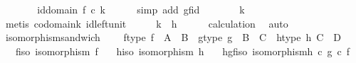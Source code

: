 \begin{isabellebody}
\ \ \isamarkupfalse%
\ \isamarkupfalse%
\ {\isachardoublequoteopen}{\isachardot}{\kern0pt}{\isachardot}{\kern0pt}{\isachardot}{\kern0pt}\ {\isacharequal}{\kern0pt}\ id{\isacharparenleft}{\kern0pt}domain\ f{\isacharparenright}{\kern0pt}\ {\isasymcirc}\isactrlsub c\ k{\isachardoublequoteclose}\isanewline
\ \ \ \ \isamarkupfalse%
\ {\isacharparenleft}{\kern0pt}simp\ add{\isacharcolon}{\kern0pt}\ gf{\isacharunderscore}{\kern0pt}id{\isacharparenright}{\kern0pt}\isanewline
\ \ \isamarkupfalse%
\ \isamarkupfalse%
\ {\isachardoublequoteopen}{\isachardot}{\kern0pt}{\isachardot}{\kern0pt}{\isachardot}{\kern0pt}\ {\isacharequal}{\kern0pt}\ k{\isachardoublequoteclose}\isanewline
\ \ \ \ \isamarkupfalse%
\ {\isacharparenleft}{\kern0pt}metis\ codomain{\isacharunderscore}{\kern0pt}k\ id{\isacharunderscore}{\kern0pt}left{\isacharunderscore}{\kern0pt}unit{\isacharparenright}{\kern0pt}\isanewline
\ \ \isamarkupfalse%
\ \isamarkupfalse%
\ {\isachardoublequoteopen}k\ {\isacharequal}{\kern0pt}\ h{\isachardoublequoteclose}\isanewline
\ \ \ \ \isamarkupfalse%
\ calculation\ \isamarkupfalse%
\ auto\isanewline
{}\isamarkupfalse%
%
\endisatagproof
{\isafoldproof}%
%
\isadelimproof
\isanewline
%
\endisadelimproof
\isanewline
{}\isamarkupfalse%
\ isomorphism{\isacharunderscore}{\kern0pt}sandwich{\isacharcolon}{\kern0pt}\ \isanewline
\ \ \ f{\isacharunderscore}{\kern0pt}type{\isacharcolon}{\kern0pt}\ {\isachardoublequoteopen}f\ {\isacharcolon}{\kern0pt}\ A\ {\isasymrightarrow}\ B{\isachardoublequoteclose}\ \ g{\isacharunderscore}{\kern0pt}type{\isacharcolon}{\kern0pt}\ {\isachardoublequoteopen}g\ {\isacharcolon}{\kern0pt}\ B\ {\isasymrightarrow}\ C{\isachardoublequoteclose}\ \ h{\isacharunderscore}{\kern0pt}type{\isacharcolon}{\kern0pt}\ {\isachardoublequoteopen}h{\isacharcolon}{\kern0pt}\ C\ {\isasymrightarrow}\ D{\isachardoublequoteclose}\isanewline
\ \ \ f{\isacharunderscore}{\kern0pt}iso{\isacharcolon}{\kern0pt}\ {\isachardoublequoteopen}isomorphism\ f{\isachardoublequoteclose}\isanewline
\ \ \ h{\isacharunderscore}{\kern0pt}iso{\isacharcolon}{\kern0pt}\ {\isachardoublequoteopen}isomorphism\ h{\isachardoublequoteclose}\isanewline
\ \ \ hgf{\isacharunderscore}{\kern0pt}iso{\isacharcolon}{\kern0pt}\ {\isachardoublequoteopen}isomorphism{\isacharparenleft}{\kern0pt}h\ {\isasymcirc}\isactrlsub c\ g\ {\isasymcirc}\isactrlsub c\ f{\isacharparenright}{\kern0pt}{\isachardoublequoteclose}\isanewline

\end{isabellebody}
